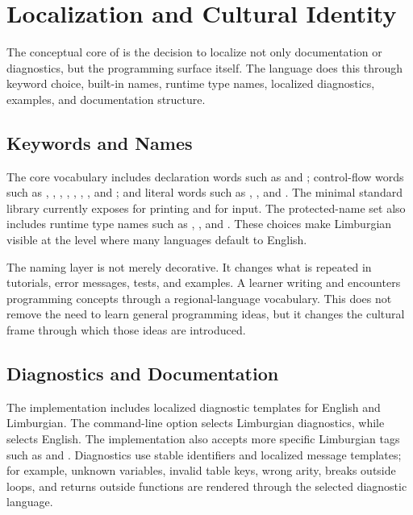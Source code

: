 \section{Localization and Cultural Identity}

The conceptual core of \plat{} is the decision to localize not only
documentation or diagnostics, but the programming surface itself. The language
does this through keyword choice, built-in names, runtime type names,
localized diagnostics, examples, and documentation structure.

\subsection{Keywords and Names}

The core vocabulary includes declaration words such as  and
; control-flow words such as , ,
, , , , , and
; and literal words such as , , and
. The minimal standard library currently exposes
 for printing and  for input. The protected-name
set also includes runtime type names such as , , and
. These choices make Limburgian visible at the level where many
languages default to English.

The naming layer is not merely decorative. It changes what is repeated in
tutorials, error messages, tests, and examples. A learner writing
 and  encounters programming concepts
through a regional-language vocabulary. This does not remove the need to learn
general programming ideas, but it changes the cultural frame through which
those ideas are introduced.

\subsection{Diagnostics and Documentation}

The implementation includes localized diagnostic templates for English and
Limburgian. The command-line option  selects Limburgian
diagnostics, while  selects English. The implementation also
accepts more specific Limburgian tags such as  and
. Diagnostics use stable identifiers and localized message
templates; for example, unknown variables, invalid table keys, wrong arity,
breaks outside loops, and returns outside functions are rendered through the
selected diagnostic language.

